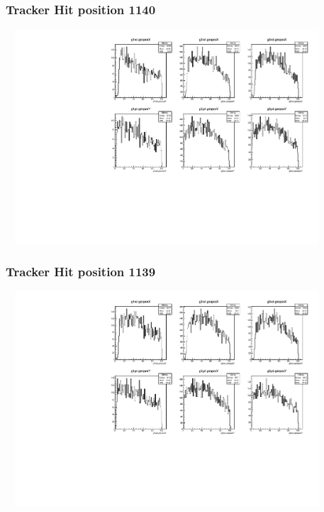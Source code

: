 \documentclass[slidestop,compress,mathserif]{beamer}
\begin{document}
\begin{frame}\frametitle{Tracker Hit position 1140}
	 \includegraphics[width=12cm,height=8cm]{Tracker_Hit_position_1140.pdf}
\end{frame}
\begin{frame}\frametitle{Tracker Hit position 1139}
	 \includegraphics[width=12cm,height=8cm]{Tracker_Hit_position_1139.pdf}
\end{frame}
\end{document}
